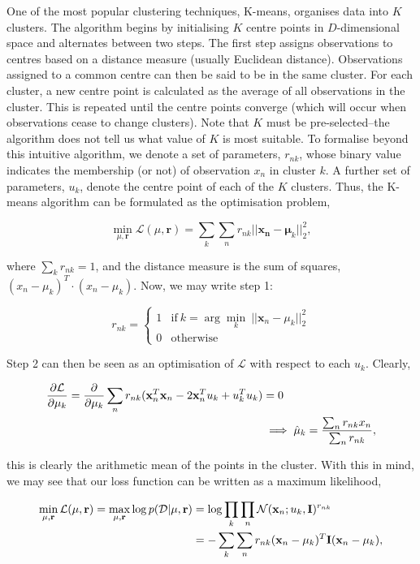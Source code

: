 \documentclass[11pt]{amsart}
\begin{document}
One of the most popular clustering techniques, K-means, organises data into $K$ clusters. The algorithm begins by initialising $K$ centre points in $D$-dimensional space and alternates between two steps. The first step assigns observations to centres based on a distance measure (usually Euclidean distance). Observations assigned to a common centre can then be said to be in the same cluster. For each cluster, a new centre point is calculated as the average of all observations in the cluster. This is repeated until the centre points converge (which will occur when observations cease to change clusters). Note that $K$ must be pre-selected--the algorithm does not tell us what value of $K$ is most suitable. To formalise beyond this intuitive algorithm, we denote a set of parameters, $r_{nk}$, whose binary value indicates the membership (or not) of observation $x_n$ in cluster $k$. A further set of parameters, $u_k$, denote the centre point of each of the $K$ clusters. Thus, the K-means algorithm can be formulated as the optimisation problem,

$$\min_{\mu, \mathbf{r}} \mathcal{L}(\mu, \mathbf{r}) = \sum_k\sum_n r_{nk}||\mathbf{x_n} - \mathbf{\mu}_k||^2_2,$$

where $\sum_k r_{nk} = 1$, and the distance measure is the sum of squares, $(x_n - \mu_k)^T\cdot(x_n - \mu_k)$. Now, we may write step 1:

\[r_{nk} = \begin{cases}
    1 & \text{if} \ k = \arg \min_k \ ||\mathbf{x}_n - \mu_k||_2^2 \\
    0 & \text{otherwise}
\end{cases}\]

Step 2 can then be seen as an optimisation of $\mathcal{L}$ with respect to each $u_k$. Clearly,

\begin{align}\frac{\partial\mathcal{L}}{\partial\mu_k} = \frac{\partial}{\partial\mu_k}\sum_n r_{nk} (\mathbf{x}_n^T\mathbf{x}_n - 2\mathbf{x}_n^Tu_k + u_k^Tu_k) &= 0 \notag \\
&\implies \hat{\mu}_k = \frac{\sum_nr_{nk}x_n}{\sum_nr_{nk}}, \notag
\end{align}

this is clearly the arithmetic mean of the points in the cluster. With this in mind, we may see that our loss function can be written as a maximum likelihood,

\begin{align}\min_{\mu, \mathbf{r}} \mathcal{L}(\mu, \mathbf{r}) = \max_{\mu, \mathbf{r}} \log p(\mathcal{D} | \mu, \mathbf{r}) &= \log\prod_k\prod_n \mathcal{N}(\mathbf{x}_n ; u_k, \mathbf{I})^{r_{nk}} \notag \\
&= -\sum_k\sum_nr_{nk}(\mathbf{x}_n - \mu_k)^T\mathbf{I}(\mathbf{x}_n - \mu_k), \notag
\end{align}
\end{document}

